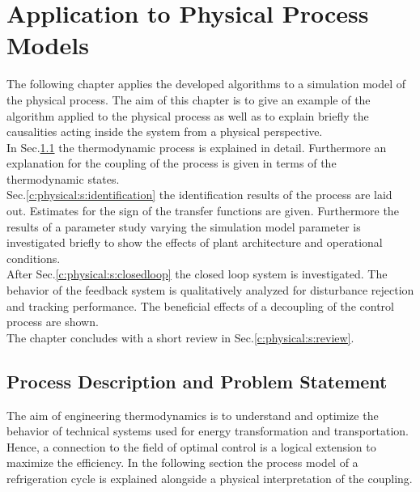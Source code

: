 \chapter{Application to Physical Process Models}
\label{c:physical}

The following chapter applies the developed algorithms to a simulation model of the physical process. The aim of this chapter is to give an example of the algorithm applied to the physical process as well as to explain briefly the causalities acting inside the system from a physical perspective. \\

In Sec.\ref{c:physical:s:process} the thermodynamic process is explained in detail. Furthermore an explanation for the coupling of the process is given in terms of the thermodynamic states.\\

Sec.\ref{c:physical:s:identification} the identification results of the process are laid out. Estimates for the sign of the transfer functions are given. Furthermore the results of a parameter study varying the simulation model parameter is investigated briefly to show the effects of plant architecture and operational conditions.\\

After Sec.\ref{c:physical:s:closedloop} the closed loop system is investigated. The behavior of the feedback system is qualitatively analyzed for disturbance rejection and tracking performance. The beneficial effects of a decoupling of the control process are shown.\\

The chapter concludes with a short review in Sec.\ref{c:physical:s:review}.

\section{Process Description and Problem Statement} \label{c:physical:s:process}

The aim of engineering thermodynamics is to understand and optimize the  behavior of technical systems used for energy transformation and transportation. Hence, a connection to the field of optimal control is a logical extension to maximize the efficiency. In the following section the process model of a refrigeration cycle is explained alongside a physical interpretation of the coupling.\\

